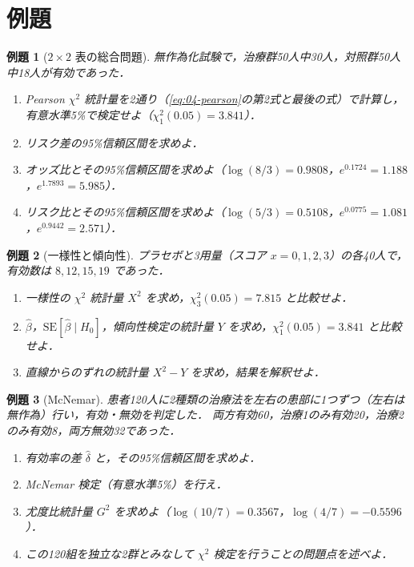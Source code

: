 \documentclass[a4paper,11pt,openany]{ltjsbook}
\newtheorem{reidai}{例題}[chapter]
\newcommand{\SE}{\mathrm{SE}}
\begin{document}
\section{例題}\label{sec:04-ex}
\begin{reidai}[$2\times2$ 表の総合問題]\label{reidai:04-1}
無作為化試験で，治療群50人中30人，対照群50人中18人が有効であった．
\begin{enumerate}[label=(\arabic*)]
\item Pearson $\chi^2$ 統計量を2通り（\cref{eq:04-pearson}の第2式と最後の式）で計算し，有意水準5\%で検定せよ（$\chi^2_1(0.05)=3.841$）．
\item リスク差の95\%信頼区間を求めよ．
\item オッズ比とその95\%信頼区間を求めよ（$\log(8/3)=0.9808$，$e^{0.1724}=1.188$，$e^{1.7893}=5.985$）．
\item リスク比とその95\%信頼区間を求めよ（$\log(5/3)=0.5108$，$e^{0.0775}=1.081$，$e^{0.9442}=2.571$）．
\end{enumerate}
\end{reidai}

\begin{reidai}[一様性と傾向性]\label{reidai:04-2}
プラセボと3用量（スコア $x=0,1,2,3$）の各40人で，有効数は $8,12,15,19$ であった．
\begin{enumerate}[label=(\arabic*)]
\item 一様性の $\chi^2$ 統計量 $X^2$ を求め，$\chi^2_3(0.05)=7.815$ と比較せよ．
\item $\hat\beta$，$\SE[\hat\beta\mid H_0]$，傾向性検定の統計量 $Y$ を求め，$\chi^2_1(0.05)=3.841$ と比較せよ．
\item 直線からのずれの統計量 $X^2-Y$ を求め，結果を解釈せよ．
\end{enumerate}
\end{reidai}

\begin{reidai}[McNemar]\label{reidai:04-3}
患者120人に2種類の治療法を左右の患部に1つずつ（左右は無作為）行い，有効・無効を判定した．
両方有効60，治療1のみ有効20，治療2のみ有効8，両方無効32であった．
\begin{enumerate}[label=(\arabic*)]
\item 有効率の差 $\hat\delta$ と，その95\%信頼区間を求めよ．
\item McNemar 検定（有意水準5\%）を行え．
\item 尤度比統計量 $G^2$ を求めよ（$\log(10/7)=0.3567$，$\log(4/7)=-0.5596$）．
\item この120組を独立な2群とみなして $\chi^2$ 検定を行うことの問題点を述べよ．
\end{enumerate}
\end{reidai}
\end{document}
